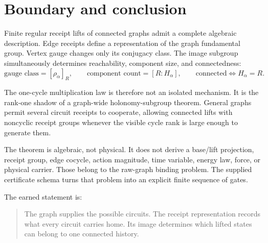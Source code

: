 \section{Boundary and conclusion}

Finite regular receipt lifts of connected graphs admit a complete algebraic
description. Edge receipts define a representation of the graph fundamental
group. Vertex gauge changes only its conjugacy class. The image subgroup
simultaneously determines reachability, component size, and connectedness:
\[
\text{gauge class}=[\rho_{\alpha}]_R,
\qquad
\text{component count}=[R:H_{\alpha}],
\qquad
\text{connected}\Longleftrightarrow H_{\alpha}=R.
\]

The one-cycle multiplication law is therefore not an isolated mechanism. It
is the rank-one shadow of a graph-wide holonomy-subgroup theorem. General
graphs permit several circuit receipts to cooperate, allowing connected lifts
with noncyclic receipt groups whenever the visible cycle rank is large enough
to generate them.

The theorem is algebraic, not physical. It does not derive a base/lift
projection, receipt group, edge cocycle, action magnitude, time variable,
energy law, force, or physical carrier. Those belong to the raw-graph binding
problem. The supplied certificate schema turns that problem into an explicit
finite sequence of gates.

The earned statement is:

\begin{quote}
The graph supplies the possible circuits. The receipt representation records
what every circuit carries home. Its image determines which lifted states can
belong to one connected history.
\end{quote}
